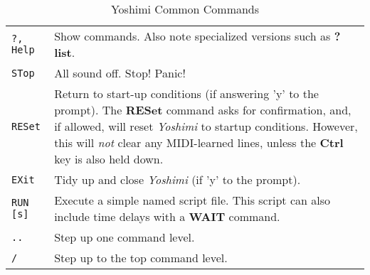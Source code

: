 \begin{center}
\begin{longtable}{p{2cm} p{10cm}}
\caption[Yoshimi Common Commands]{Yoshimi Common Commands} \\

\texttt{?,  Help} &
   Show commands.  Also note specialized versions such as \textbf{? list}. \\
\texttt{STop} &
   All sound off.  Stop!  Panic! \\
\texttt{RESet} &
   Return to start-up conditions (if answering 'y' to the prompt).
   The \textbf{RESet} command asks for confirmation, and, if allowed, will
   reset \textsl{Yoshimi} to startup conditions.
   However, this will \textsl{not} clear any MIDI-learned lines, unless the \textbf{Ctrl} key is also held down.\\
\texttt{EXit} &
   Tidy up and close \textsl{Yoshimi} (if 'y' to the prompt). \\
\texttt{RUN [s]} &
   Execute a simple named script file.
   This script can also include time delays with a \textbf{WAIT} command.\\
\texttt{..} &
   Step up one command level. \\
\texttt{/} &
   Step up to the top command level. \\

\end{longtable}
\end{center}

